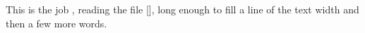 \documentclass{article}
\begin{document}
This is the job \texttt{\jobname}, reading the file [\CurrentFile], long
enough to fill a line of the text width and then a few more words.


\end{document}
